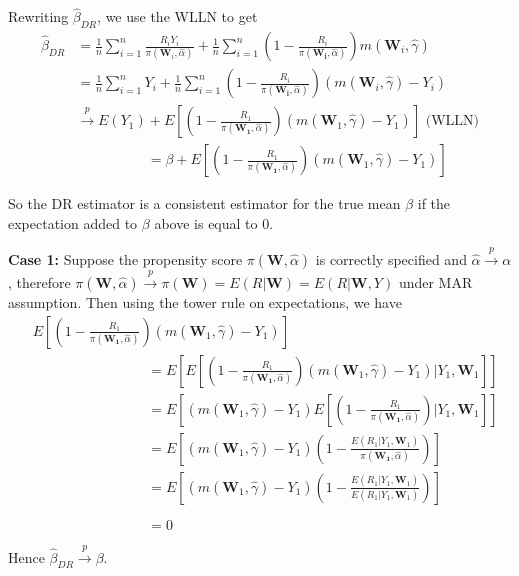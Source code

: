\documentclass[12pt,twoside]{article}
\begin{document}
Rewriting $\hat{\beta}_{DR}$, we use the WLLN to get
\begin{align*}
    \hat{\beta}_{DR} & = \frac{1}{n}\sum_{i=1}^{n}\frac{R_iY_i}{\pi(\mathbf{W}_i, \hat{\alpha})} + \frac{1}{n}\sum_{i=1}^{n} \left(1 - \frac{R_i}{\pi(\mathbf{W_i},\hat{\alpha})} \right) m(\mathbf{W}_i, \hat\gamma) \\
    & = \frac{1}{n}\sum_{i=1}^{n} Y_i + \frac{1}{n}\sum_{i=1}^{n}\left(1 - \frac{R_i}{\pi(\mathbf{W_i},\hat{\alpha})} \right) (m(\mathbf{W}_i, \hat\gamma)-Y_i) \\
    & \xrightarrow{p} E(Y_1) + E\left[\left(1 - \frac{R_1}{\pi(\mathbf{W_1},\hat{\alpha})} \right) (m(\mathbf{W}_1, \hat\gamma)-Y_1)\right] \text{ (WLLN)} \\
    & \phantom{\xrightarrow{p} E(Y_1)} = \beta + E\left[\left(1 - \frac{R_1}{\pi(\mathbf{W_1},\hat{\alpha})} \right) (m(\mathbf{W}_1, \hat\gamma)-Y_1)\right]
\end{align*}

So the DR estimator is a consistent estimator for the true mean $\beta$ if the expectation added to $\beta$ above is equal to 0.

\textbf{Case 1:} Suppose the propensity score $\pi(\mathbf{W},\hat{\alpha})$ is correctly specified and $\hat{\alpha} \xrightarrow{p} \alpha$, therefore  $\pi(\mathbf{W},\hat{\alpha}) \xrightarrow{p} \pi(\mathbf{W}) = E(R|\mathbf{W}) = E(R|\mathbf{W}, Y)$ under MAR assumption. Then using the tower rule on expectations, we have
\begin{align*}
     & E \left[\left(1 - \frac{R_1}{\pi(\mathbf{W_1},\hat{\alpha})} \right) (m(\mathbf{W}_1, \hat\gamma)-Y_1)\right]  \\
     & \phantom{E [(1 - \frac{R_1}{\pi(\mathbf{W_1},\hat{\alpha})})} = E\left[E\left[\left(1 - \frac{R_1}{\pi(\mathbf{W_1},\hat{\alpha})} \right) (m(\mathbf{W}_1, \hat\gamma)-Y_1)|Y_1, \mathbf{W}_1\right]\right] \\
     & \phantom{E [(1 - \frac{R_1}{\pi(\mathbf{W_1},\hat{\alpha})})} = E\left[ (m(\mathbf{W}_1, \hat\gamma)-Y_1)E\left[\left(1 - \frac{R_1}{\pi(\mathbf{W_1},\hat{\alpha})} \right)|Y_1, \mathbf{W}_1\right]\right] \\
     & \phantom{E [(1 - \frac{R_1}{\pi(\mathbf{W_1},\hat{\alpha})})} = E\left[ (m(\mathbf{W}_1, \hat\gamma)-Y_1)\left(1 - \frac{E(R_1|Y_1, \mathbf{W}_1)}{\pi(\mathbf{W_1},\hat{\alpha})} \right)\right] \\
     & \phantom{E [(1 - \frac{R_1}{\pi(\mathbf{W_1},\hat{\alpha})})} = E\left[ (m(\mathbf{W}_1, \hat\gamma)-Y_1)\left(1 - \frac{E(R_1|Y_1, \mathbf{W}_1)}{E(R_1|Y_1, \mathbf{W}_1)} \right)\right] \\
     & \phantom{E [(1 - \frac{R_1}{\pi(\mathbf{W_1},\hat{\alpha})})} = 0
\end{align*}
Hence $\hat{\beta}_{DR} \xrightarrow{p} \beta$.
\end{document}
